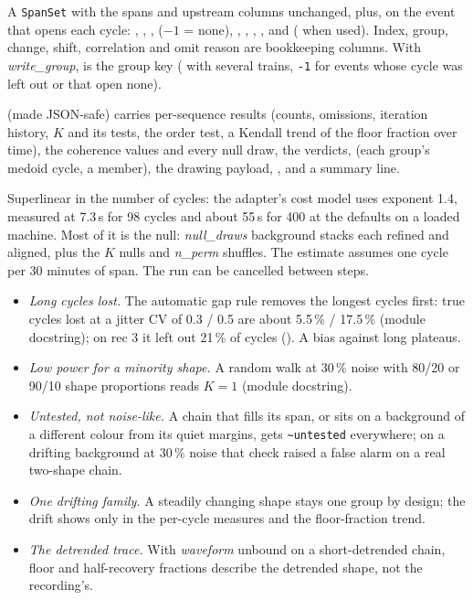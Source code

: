 A \texttt{SpanSet} with the spans and upstream columns unchanged, plus, on the event that
opens each cycle: , , ,
 ($-1$ = none), , ,
, ,  and
 ( when used). Index, group, change, shift, correlation and
omit reason are bookkeeping columns. With \emph{write\_group},  is the group key
( with several trains, \texttt{-1} for events whose cycle was left out or
that open none).

 (made JSON-safe) carries per-sequence results (counts, omissions, iteration
history, $K$ and its tests, the order test, a Kendall trend of the floor fraction over time),
the coherence values and every null draw, the verdicts,  (each group's
medoid cycle, a member), the  drawing payload, ,
 and a summary line.

Superlinear in the number of cycles: the adapter's cost model uses exponent 1.4, measured at
7.3\,s for 98 cycles and about 55\,s for 400 at the defaults on a loaded machine. Most of it is
the null: \emph{null\_draws} background stacks each refined and aligned, plus the $K$ nulls
and \emph{n\_perm} shuffles. The estimate assumes one cycle per 30 minutes of span. The run
can be cancelled between steps.

\begin{itemize}
\item \emph{Long cycles lost.} The automatic gap rule removes the longest cycles first: true
  cycles lost at a jitter CV of 0.3 / 0.5 are about 5.5\,\% / 17.5\,\% (module docstring); on
  rec 3 it left out 21\,\% of cycles (). A bias against long plateaus.
\item \emph{Low power for a minority shape.} A random walk at 30\,\% noise with 80/20 or
  90/10 shape proportions reads $K = 1$ (module docstring).
\item \emph{Untested, not noise-like.} A chain that fills its span, or sits on a background
  of a different colour from its quiet margins, gets \texttt{\textasciitilde untested}
  everywhere; on a drifting background at 30\,\% noise that check raised a false alarm on a
  real two-shape chain.
\item \emph{One drifting family.} A steadily changing shape stays one group by design; the
  drift shows only in the per-cycle measures and the floor-fraction trend.
\item \emph{The detrended trace.} With \emph{waveform} unbound on a short-detrended chain,
  floor and half-recovery fractions describe the detrended shape, not the recording's.
\end{itemize}

